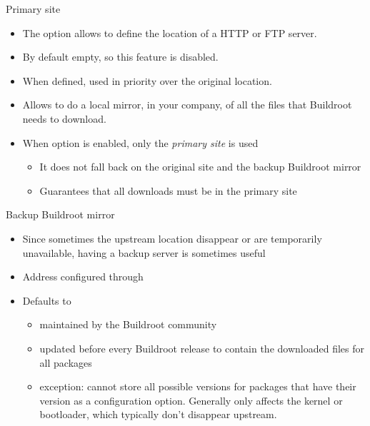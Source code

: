 \begin{frame}{Primary site}
  \begin{itemize}
  \item The  option allows to define the
    location of a HTTP or FTP server.
  \item By default empty, so this feature is disabled.
  \item When defined, used in priority over the original location.
  \item Allows to do a local mirror, in your company, of all the files
    that Buildroot needs to download.
  \item When option  is enabled, only the
    {\em primary site} is used
    \begin{itemize}
    \item It does not fall back on the original site and the backup
      Buildroot mirror
    \item Guarantees that all downloads must be in the primary site
    \end{itemize}
  \end{itemize}
\end{frame}

\begin{frame}{Backup Buildroot mirror}
  \begin{itemize}
  \item Since sometimes the upstream location disappear or are
    temporarily unavailable, having a backup server is sometimes
    useful
  \item Address configured through 
  \item Defaults to 
    \begin{itemize}
    \item maintained by the Buildroot community
    \item updated before every Buildroot release to contain the
      downloaded files for all packages
    \item exception: cannot store all possible versions for packages
      that have their version as a configuration option. Generally
      only affects the kernel or bootloader, which typically don't
      disappear upstream.
    \end{itemize}
  \end{itemize}
\end{frame}

